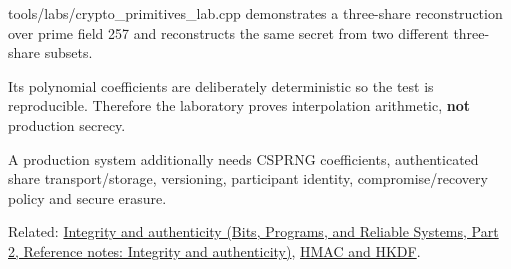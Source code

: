 tools/labs/crypto\_primitives\_lab.cpp demonstrates a three-share reconstruction over prime field 257 and reconstructs the same secret from two different three-share subsets.

Its polynomial coefficients are deliberately deterministic so the test is reproducible. Therefore the laboratory proves interpolation arithmetic, \textbf{not} production secrecy.

A production system additionally needs CSPRNG coefficients, authenticated share transport/storage, versioning, participant identity, compromise/recovery policy and secure erasure.

Related: \href{../01-Bits-Programs-and-Reliable-Systems-P02/main.pdf\#nameddest=appendix-cbe594d1ab0a}{Integrity and authenticity (Bits, Programs, and Reliable Systems, Part 2, Reference notes: Integrity and authenticity)}, \hyperref[appendix-50af792c9da7]{HMAC and HKDF}.
